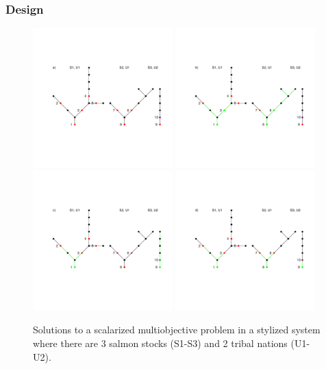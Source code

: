 \documentclass[12pt]{elsarticle}
\begin{document}
\subsubsection{Design}
\begin{figure}
\includegraphics[width=0.48\textwidth]{figures/opt_s.pdf}
\includegraphics[width=0.48\textwidth]{figures/opt_h.pdf}
\includegraphics[width=0.48\textwidth]{figures/opt_e.pdf}
\includegraphics[width=0.48\textwidth]{figures/opt_d.pdf} 
\caption{Solutions to a scalarized multiobjective problem in a stylized system where there are 3 salmon stocks (S1-S3) and 2 tribal nations (U1-U2). \label{fig:opt}}
\end{figure}%
\end{document}
